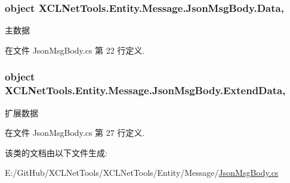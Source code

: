 \subsubsection[{\texorpdfstring{Data}{Data}}]{\setlength{\rightskip}{0pt plus 5cm}object X\+C\+L\+Net\+Tools.\+Entity.\+Message.\+Json\+Msg\+Body.\+Data\hspace{0.3cm}{\ttfamily [get]}, {\ttfamily [set]}}\hypertarget{class_x_c_l_net_tools_1_1_entity_1_1_message_1_1_json_msg_body_a8bf6d68ba33b65eac5431b4d2873e719}{}\label{class_x_c_l_net_tools_1_1_entity_1_1_message_1_1_json_msg_body_a8bf6d68ba33b65eac5431b4d2873e719}


主数据 



在文件 Json\+Msg\+Body.\+cs 第 22 行定义.

\subsubsection[{\texorpdfstring{Extend\+Data}{ExtendData}}]{\setlength{\rightskip}{0pt plus 5cm}object X\+C\+L\+Net\+Tools.\+Entity.\+Message.\+Json\+Msg\+Body.\+Extend\+Data\hspace{0.3cm}{\ttfamily [get]}, {\ttfamily [set]}}\hypertarget{class_x_c_l_net_tools_1_1_entity_1_1_message_1_1_json_msg_body_a0382629d68979ea8a39383a1d9891ab7}{}\label{class_x_c_l_net_tools_1_1_entity_1_1_message_1_1_json_msg_body_a0382629d68979ea8a39383a1d9891ab7}


扩展数据 



在文件 Json\+Msg\+Body.\+cs 第 27 行定义.



该类的文档由以下文件生成\+:\begin{DoxyCompactItemize}
\item 
E\+:/\+Git\+Hub/\+X\+C\+L\+Net\+Tools/\+X\+C\+L\+Net\+Tools/\+Entity/\+Message/\hyperlink{_json_msg_body_8cs}{Json\+Msg\+Body.\+cs}\end{DoxyCompactItemize}
